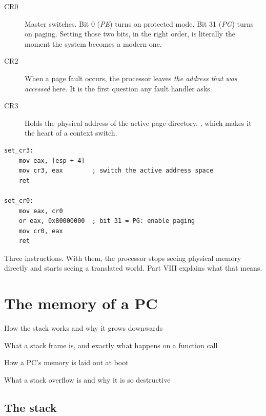 \begin{description}
  \item[CR0] Master switches. Bit 0 (\emph{PE}) turns on protected mode. Bit 31 (\emph{PG}) turns
    on paging. Setting those two bits, in the right order, is literally the moment the system
    becomes a modern one.
  \item[CR2] When a page fault occurs, the processor leaves \emph{the address that was accessed}
    here. It is the first question any fault handler asks.
  \item[CR3] Holds the physical address of the active page directory. , which makes it the heart of a context switch.
\end{description}

\begin{lstlisting}[style=asm]
set_cr3:
    mov eax, [esp + 4]
    mov cr3, eax        ; switch the active address space
    ret

set_cr0:
    mov eax, cr0
    or eax, 0x80000000  ; bit 31 = PG: enable paging
    mov cr0, eax
    ret
\end{lstlisting}

Three instructions. With them, the processor stops seeing physical memory directly and starts
seeing a translated world. Part VIII explains what that means.


\chapter{The memory of a PC}

\begin{goals}
  \item How the stack works and why it grows downwards
  \item What a stack frame is, and exactly what happens on a function call
  \item How a PC's memory is laid out at boot
  \item What a stack overflow is and why it is so destructive
\end{goals}

\section{The stack}

